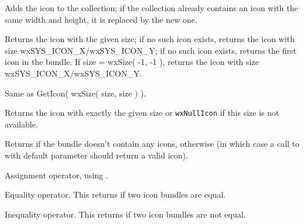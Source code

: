 Adds the icon to the collection; if the collection already
contains an icon with the same width and height, it is
replaced by the new one.


\label{wxiconbundlegeticon}


Returns the icon with the given size; if no such icon exists,
returns the icon with size wxSYS\_ICON\_X/wxSYS\_ICON\_Y;
if no such icon exists,
returns the first icon in the bundle. If size = wxSize( -1, -1 ),
returns the icon with size wxSYS\_ICON\_X/wxSYS\_ICON\_Y.


Same as GetIcon( wxSize( size, size ) ).


\label{wxiconbundlegeticonofexactsize}


Returns the icon with exactly the given size or \texttt{wxNullIcon} if this
size is not available.


\label{wxiconbundleisempty}


Returns \true if the bundle doesn't contain any icons, \false otherwise (in
which case a call to  with default
parameter should return a valid icon).


\label{wxiconbundleoperatorassign}


Assignment operator, using .


\label{wxiconbundleoperatorequals}


Equality operator. This returns \true if two icon bundles are equal.


\label{wxiconbundleoperatornotequals}


Inequality operator. This returns \true if two icon bundles are not equal.
